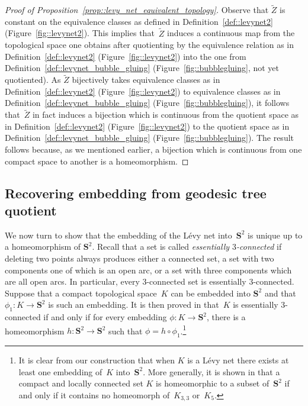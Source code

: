 \documentclass[JEP,XML,SOM,Unicode]{cedram}
\theoremstyle{plain}
\numberwithin{theorem}{section}
\theoremstyle{definition}
\renewcommand{\S}{{\mathbf S}}
\let\wt\widetilde
\begin{document}
\begin{proof}[Proof of Proposition~\ref{prop::levy_net_equivalent_topology}]
Observe that $\wt{Z}$ is constant on the equivalence classes as defined in Definition~\ref{def::levynet2} (Figure~\ref{fig::levynet2}). This implies that~$\wt{Z}$ induces a continuous map from the topological space one obtains after quotienting by the equivalence relation as in Definition~\ref{def::levynet2} (Figure~\ref{fig::levynet2}) into the one from Definition~\ref{def::levynet_bubble_gluing} (Figure~\ref{fig::bubblegluing}, not yet quotiented). As $\wt{Z}$ bijectively takes equivalence classes as in Definition~\ref{def::levynet2} (Figure~\ref{fig::levynet2}) to equivalence classes as in Definition~\ref{def::levynet_bubble_gluing} (Figure~\ref{fig::bubblegluing}), it follows that~$\wt{Z}$ in fact induces a bijection which is continuous from the quotient space as in Definition~\ref{def::levynet2} (Figure~\ref{fig::levynet2}) to the quotient space as in Definition~\ref{def::levynet_bubble_gluing} (Figure~\ref{fig::bubblegluing}). The result follows because, as we mentioned earlier, a bijection which is continuous from one compact space to another is a homeomorphism.
\end{proof}

\subsection{Recovering embedding from geodesic tree quotient}
\label{subsec::recovering_embedding}

We now turn to show that the embedding of the Lévy net into~$\S^2$ is unique up to a homeomorphism of $\S^2$. Recall that a set is called \emph{essentially $3$-connected} if deleting two points always produces either a connected set, a set with two components one of which is an open arc, or a set with three components which are all open arcs. In particular, every $3$-connected set is essentially $3$-connected. Suppose that a compact topological space~$K$ can be embedded into $\S^2$ and that $\phi_1 \colon K \to \S^2$ is such an embedding. It is then proved in \cite{3connectedembeduniquely} that~$K$ is essentially $3$-connected if and only if for every embedding $\phi \colon K \to \S^2$, there is a homeomorphism $h \colon \S^2 \to \S^2$ such that $\phi = h \circ \phi_1$.\footnote{It is clear from our construction that when $K$ is a Lévy net there exists at least one embedding of~$K$ into~$\S^2$. More generally, it is shown in \cite{planarityofcompactmetricspaces} that a compact and locally connected set $K$ is homeomorphic to a subset of~$\S^2$ if and only if it contains no homeomorph of~$K_{3,3}$ or~$K_5$.}
\end{document}
